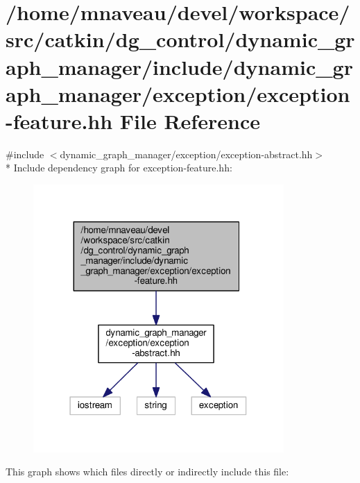 \hypertarget{exception-feature_8hh}{}\section{/home/mnaveau/devel/workspace/src/catkin/dg\+\_\+control/dynamic\+\_\+graph\+\_\+manager/include/dynamic\+\_\+graph\+\_\+manager/exception/exception-\/feature.hh File Reference}
\label{exception-feature_8hh}
{\ttfamily \#include $<$dynamic\+\_\+graph\+\_\+manager/exception/exception-\/abstract.\+hh$>$}\\*
Include dependency graph for exception-\/feature.hh\+:\nopagebreak
\begin{figure}[H]
\begin{center}
\leavevmode
\includegraphics[width=271pt]{exception-feature_8hh__incl}
\end{center}
\end{figure}
This graph shows which files directly or indirectly include this file\+:\nopagebreak
